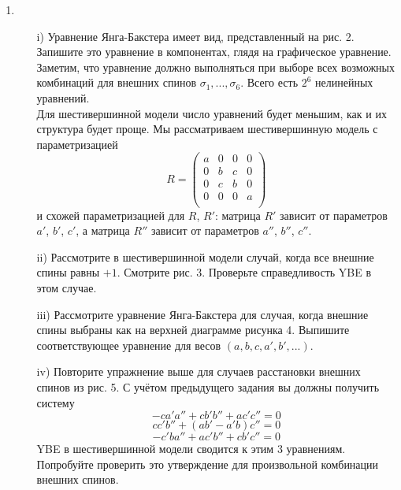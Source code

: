 \documentclass[12pt]{article}
\theoremstyle{definition}
\begin{document}
\begin{enumerate}
    \item
    \begin{itemize}
        \item[i)] Уравнение Янга-Бакстера имеет вид, представленный на рис. 2. Запишите это уравнение в компонентах, глядя на графическое уравнение.\\
        Заметим, что уравнение должно выполняться при выборе всех возможных комбинаций для внешних спинов $\sigma_1,...,\sigma_6$. Всего есть $2^6$ нелинейных уравнений.\\
        Для шестивершинной модели число уравнений будет меньшим, как и их структура будет проще. Мы рассматриваем шестивершинную модель с параметризацией
        \begin{equation}
            R=\begin{pmatrix}
                a & 0 & 0 & 0\\
                0 & b & c & 0\\
                0 & c & b & 0\\
                0 & 0 & 0 & a\\
            \end{pmatrix}
        \end{equation}
        и схожей параметризацией для $R$, $R'$: матрица $R'$ зависит от параметров $a'$, $b'$, $c'$, а матрица $R''$ зависит от параметров $a''$, $b''$, $c''$.
        \item[ii)] Рассмотрите в шестивершинной модели случай, когда все внешние спины равны $+1$. Смотрите рис. 3. Проверьте справедливость YBE в этом случае.
        \item[iii)] Рассмотрите уравнение Янга-Бакстера для случая, когда внешние спины выбраны как на верхней диаграмме рисунка 4. Выпишите соответствующее уравнение для весов $(a,b,c,a',b',...)$.
        \item[iv)] Повторите упражнение выше для случаев расстановки внешних спинов из рис. 5. С учётом предыдущего задания вы должны получить систему
        \begin{equation}
            -ca'a''+cb'b''+ac'c''=0
        \end{equation}
        \begin{equation}
            cc'b''+(ab'-a'b)c''=0
        \end{equation}
        \begin{equation}
            -c'ba''+ac'b''+cb'c''=0
        \end{equation}
        YBE в шестивершинной модели сводится к этим 3 уравнениям. Попробуйте проверить это утверждение для произвольной комбинации внешних спинов.

\end{itemize}
\end{enumerate}
\end{document}

